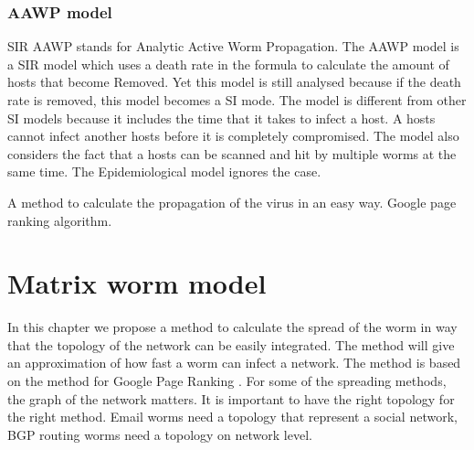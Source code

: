 \subsubsection{AAWP model}
SIR AAWP stands for Analytic Active Worm Propagation. The AAWP model is a SIR model which uses a death rate in the formula to calculate the amount of hosts that become Removed. Yet this model is still analysed because if the death rate is removed, this model becomes a SI mode. The model is different from other SI models because it includes the time that it takes to infect a host. A hosts cannot infect another hosts before it is completely compromised. The model also considers the fact that a hosts can be scanned and hit by multiple worms at the same time. The Epidemiological model ignores the case. %




A method to calculate the propagation of the virus in an easy way. Google page ranking algorithm. 


\section{Matrix worm model}
\label{eigenmatrixmethode}

In this chapter we propose a method to calculate the spread of the worm in way that the topology of the network can be easily integrated. The method will give an approximation of how fast a worm can infect a network. The method is based on the method for Google Page Ranking \cite{GoogleRank}. 
For some of the spreading methods, the graph of the network matters. It is important to have the right topology for the right method. Email worms need a topology that represent a social network, BGP routing worms need a topology on network level. \\
%

